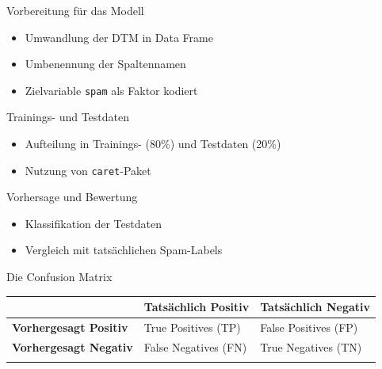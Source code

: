 \documentclass[
  ignorenonframetext,
]{beamer}
\newcounter{none} %
\providecommand{\tightlist}{%
  \setlength{\itemsep}{0pt}\setlength{\parskip}{0pt}}
\begin{document}
\begin{frame}[fragile]{Vorbereitung für das Modell}
\protect{}\label{vorbereitung-fuxfcr-das-modell}
\begin{itemize}
\tightlist
\item
  Umwandlung der DTM in Data Frame
\item
  Umbenennung der Spaltennamen
\item
  Zielvariable \texttt{spam} als Faktor kodiert
\end{itemize}
\end{frame}

\begin{frame}[fragile]{Trainings- und Testdaten}
\protect{}\label{trainings--und-testdaten}
\begin{itemize}
\tightlist
\item
  Aufteilung in Trainings- (80\%) und Testdaten (20\%)
\item
  Nutzung von \texttt{caret}-Paket
\end{itemize}
\end{frame}

\begin{frame}{Vorhersage und Bewertung}
\protect{}\label{vorhersage-und-bewertung}
\begin{itemize}
\tightlist
\item
  Klassifikation der Testdaten
\item
  Vergleich mit tatsächlichen Spam-Labels
\end{itemize}
\end{frame}

\begin{frame}{Die Confusion Matrix}
\protect{}\label{die-confusion-matrix}
{\def\LTcaptype{none} %
\begin{longtable}[]{@{}
  >{\raggedright\arraybackslash}p{}
  >{\raggedright\arraybackslash}p{}
  >{\raggedright\arraybackslash}p{}@{}}
\toprule\noalign{}
\begin{minipage}[b]{\linewidth}\raggedright
\end{minipage} & \begin{minipage}[b]{\linewidth}\raggedright
Tatsächlich Positiv
\end{minipage} & \begin{minipage}[b]{\linewidth}\raggedright
Tatsächlich Negativ
\end{minipage} \\
\midrule\noalign{}
\endhead
\textbf{Vorhergesagt Positiv} & True Positives (TP) & False Positives
(FP) \\
\textbf{Vorhergesagt Negativ} & False Negatives (FN) & True Negatives
(TN) \\
\bottomrule\noalign{}
\end{longtable}
}
\end{frame}
\end{document}
